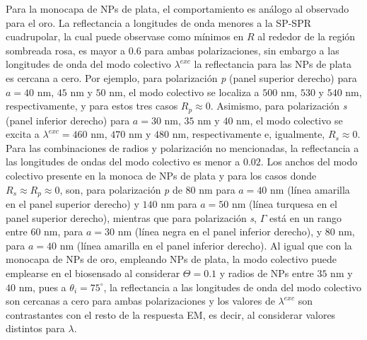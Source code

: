 Para la monocapa de NPs de plata, el comportamiento es análogo al observado para el oro. La reflectancia a longitudes de onda menores a la SP-SPR cuadrupolar, la cual puede observase como mínimos en $R$ al rededor de la región sombreada rosa, es mayor a $0.6$ para ambas polarizaciones, sin embargo a las longitudes de onda del modo colectivo $\lambda^{exc}$ la reflectancia para las NPs de plata es cercana a cero. Por ejemplo, para polarización \emph{p} (panel superior derecho) para $a=40$ nm, $45$ nm y $50$ nm, el modo colectivo se localiza a $500$ nm, $530$ y $540$ nm, respectivamente, y para estos tres casos $R_p\approx 0$. Asimismo, para polarización \emph{s} (panel inferior derecho) para $a=30$ nm, $35$ nm y $40$ nm, el modo colectivo se excita a $\lambda^{exc}=460$ nm, $470$ nm y $480$ nm, respectivamente e, igualmente, $R_s\approx 0$. Para las combinaciones de radios y polarización no mencionadas, la reflectancia a las longitudes de ondas del modo colectivo es menor a $0.02$. Los anchos del modo colectivo presente en la monoca de NPs de plata y para los casos donde $R_s\approx R_p \approx 0$, son, para polarización \emph{p} de $80$ nm para $a=40$ nm (línea amarilla en el panel superior derecho) y $140$ nm para $a=50$ nm (línea turquesa en el panel superior derecho), mientras que para polarización \emph{s}, $\Gamma$ está en un rango entre $60$ nm, para $a=30$ nm (línea negra en el panel inferior derecho), y $80$ nm, para $a=40$ nm (línea amarilla en el panel inferior derecho). Al igual que con la monocapa de NPs de oro, empleando NPs de plata, la modo colectivo puede emplearse en el biosensado al considerar $\Theta=0.1$ y radios de NPs entre $35$ nm y $40$ nm, pues a $\theta_i=75^\circ$, la reflectancia a las longitudes de onda del modo colectivo son cercanas a cero para ambas polarizaciones y los valores de $\lambda^{exc}$ son contrastantes con el resto de la respuesta EM, es decir, al considerar valores distintos para $\lambda$.

